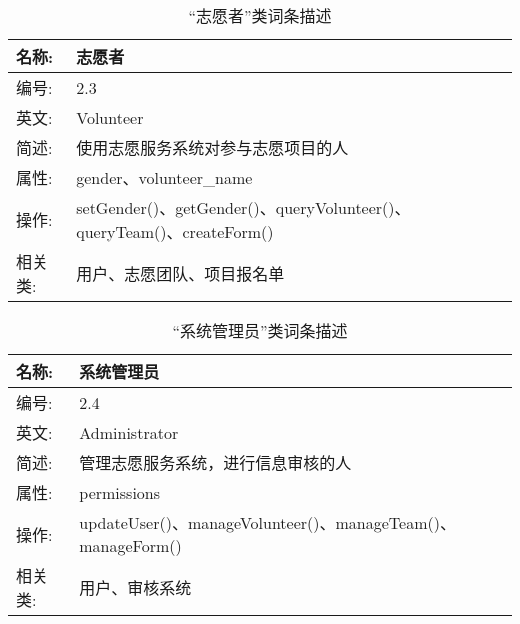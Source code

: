 \begin{table}[H]  
\caption{“志愿者”类词条描述}  
\begin{center}  
    \begin{tabular}{l p{11cm}} 
        \hline
        \quad 名称:  &  志愿者 \\
        \hline
        \quad 编号:  & 2.3 \\
        \hline
        \quad 英文:  &  Volunteer \\
        \hline
        \quad 简述:  & 使用志愿服务系统对参与志愿项目的人 \\
        \hline
        \quad 属性:  & gender、volunteer\_name
 \\
        \hline
        \quad 操作:  & setGender()、getGender()、queryVolunteer()、queryTeam()、createForm()
 \\
        \hline
        \quad 相关类:  & 用户、志愿团队、项目报名单 \\
        \hline
    \end{tabular}
\end{center}
\end{table}

\begin{table}[H]  
\caption{“系统管理员”类词条描述}  
\begin{center}  
    \begin{tabular}{l p{11cm}} 
        \hline
        \quad 名称:  &  系统管理员 \\
        \hline
        \quad 编号:  & 2.4 \\
        \hline
        \quad 英文:  &  Administrator \\
        \hline
        \quad 简述:  & 管理志愿服务系统，进行信息审核的人 \\
        \hline
        \quad 属性:  & permissions \\
        \hline
        \quad 操作:  & updateUser()、manageVolunteer()、manageTeam()、manageForm()\\
        \hline
        \quad 相关类:  & 用户、审核系统\\
        \hline
    \end{tabular}
\end{center}
\end{table}

